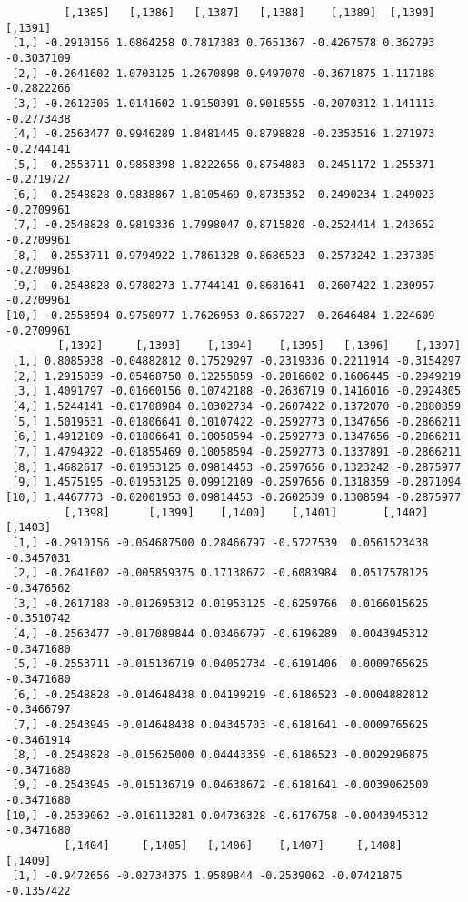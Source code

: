 \documentclass[
  letterpaper,
  DIV=11,
  numbers=noendperiod]{scrreprt}
\begin{document}
\begin{verbatim}
         [,1385]   [,1386]   [,1387]   [,1388]    [,1389]  [,1390]    [,1391]
 [1,] -0.2910156 1.0864258 0.7817383 0.7651367 -0.4267578 0.362793 -0.3037109
 [2,] -0.2641602 1.0703125 1.2670898 0.9497070 -0.3671875 1.117188 -0.2822266
 [3,] -0.2612305 1.0141602 1.9150391 0.9018555 -0.2070312 1.141113 -0.2773438
 [4,] -0.2563477 0.9946289 1.8481445 0.8798828 -0.2353516 1.271973 -0.2744141
 [5,] -0.2553711 0.9858398 1.8222656 0.8754883 -0.2451172 1.255371 -0.2719727
 [6,] -0.2548828 0.9838867 1.8105469 0.8735352 -0.2490234 1.249023 -0.2709961
 [7,] -0.2548828 0.9819336 1.7998047 0.8715820 -0.2524414 1.243652 -0.2709961
 [8,] -0.2553711 0.9794922 1.7861328 0.8686523 -0.2573242 1.237305 -0.2709961
 [9,] -0.2548828 0.9780273 1.7744141 0.8681641 -0.2607422 1.230957 -0.2709961
[10,] -0.2558594 0.9750977 1.7626953 0.8657227 -0.2646484 1.224609 -0.2709961
        [,1392]     [,1393]    [,1394]    [,1395]   [,1396]    [,1397]
 [1,] 0.8085938 -0.04882812 0.17529297 -0.2319336 0.2211914 -0.3154297
 [2,] 1.2915039 -0.05468750 0.12255859 -0.2016602 0.1606445 -0.2949219
 [3,] 1.4091797 -0.01660156 0.10742188 -0.2636719 0.1416016 -0.2924805
 [4,] 1.5244141 -0.01708984 0.10302734 -0.2607422 0.1372070 -0.2880859
 [5,] 1.5019531 -0.01806641 0.10107422 -0.2592773 0.1347656 -0.2866211
 [6,] 1.4912109 -0.01806641 0.10058594 -0.2592773 0.1347656 -0.2866211
 [7,] 1.4794922 -0.01855469 0.10058594 -0.2592773 0.1337891 -0.2866211
 [8,] 1.4682617 -0.01953125 0.09814453 -0.2597656 0.1323242 -0.2875977
 [9,] 1.4575195 -0.01953125 0.09912109 -0.2597656 0.1318359 -0.2871094
[10,] 1.4467773 -0.02001953 0.09814453 -0.2602539 0.1308594 -0.2875977
         [,1398]      [,1399]    [,1400]    [,1401]       [,1402]    [,1403]
 [1,] -0.2910156 -0.054687500 0.28466797 -0.5727539  0.0561523438 -0.3457031
 [2,] -0.2641602 -0.005859375 0.17138672 -0.6083984  0.0517578125 -0.3476562
 [3,] -0.2617188 -0.012695312 0.01953125 -0.6259766  0.0166015625 -0.3510742
 [4,] -0.2563477 -0.017089844 0.03466797 -0.6196289  0.0043945312 -0.3471680
 [5,] -0.2553711 -0.015136719 0.04052734 -0.6191406  0.0009765625 -0.3471680
 [6,] -0.2548828 -0.014648438 0.04199219 -0.6186523 -0.0004882812 -0.3466797
 [7,] -0.2543945 -0.014648438 0.04345703 -0.6181641 -0.0009765625 -0.3461914
 [8,] -0.2548828 -0.015625000 0.04443359 -0.6186523 -0.0029296875 -0.3471680
 [9,] -0.2543945 -0.015136719 0.04638672 -0.6181641 -0.0039062500 -0.3471680
[10,] -0.2539062 -0.016113281 0.04736328 -0.6176758 -0.0043945312 -0.3471680
         [,1404]     [,1405]   [,1406]    [,1407]     [,1408]    [,1409]
 [1,] -0.9472656 -0.02734375 1.9589844 -0.2539062 -0.07421875 -0.1357422

\end{verbatim}
\end{document}
